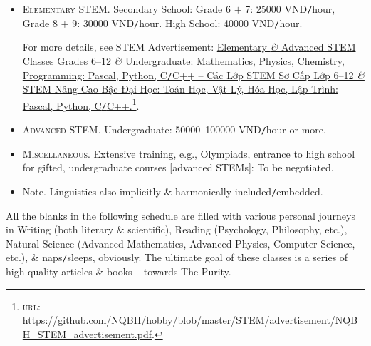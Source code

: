 \documentclass[landscape,a4paper]{article}
\begin{document}
\begin{itemize}
	\item \textsc{Elementary STEM.} Secondary School: Grade 6 $+$ 7: 25000 VND\texttt{/}hour, Grade 8 $+$ 9: 30000 VND\texttt{/}hour. High School: 40000 VND\texttt{/}hour.
	
	For more details, see STEM Advertisement: \href{https://github.com/NQBH/hobby/blob/master/STEM/advertisement/NQBH_STEM_advertisement.pdf}{Elementary {\it\&} Advanced STEM Classes Grades 6--12 {\it\&} Undergraduate: Mathematics, Physics, Chemistry, Programming: Pascal, Python, C{\tt/}C++ -- Các Lớp STEM Sơ Cấp Lớp 6--12 {\it\&} STEM Nâng Cao Bậc Đại Học: Toán Học, Vật Lý, Hóa Học, Lập Trình: Pascal, Python, C{\tt/}C++.}\footnote{\textsc{url}: \url{https://github.com/NQBH/hobby/blob/master/STEM/advertisement/NQBH_STEM_advertisement.pdf}.}.
	\item \textsc{Advanced STEM.} Undergraduate: 50000--100000 VND\texttt{/}hour or more.
	\item \textsc{Miscellaneous.} Extensive training, e.g., Olympiads, entrance to high school for gifted, undergraduate courses [advanced STEMs]: To be negotiated.
	\item {\sf Note.} Linguistics also implicitly \& harmonically included\texttt{/}embedded.
	
\end{itemize}
All the blanks in the following schedule are filled with various personal journeys in Writing (both literary \& scientific), Reading (Psychology, Philosophy, etc.), Natural Science (Advanced Mathematics, Advanced Physics, Computer Science, etc.), \& naps\texttt{/}sleeps, obviously. The ultimate goal of these classes is a series of high quality articles \& books -- towards The Purity.
\cleardoublepage
\CellHeight{.4in}
\CellWidth{1.4in}
\TextSize{\normalsize}
\SevenDay
\TwentyFourHour
{}
\begin{schedule}
\end{schedule}
\end{document}
